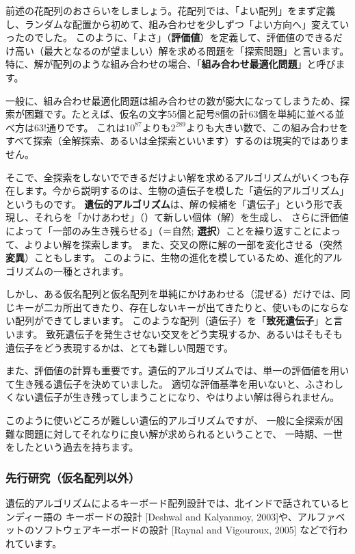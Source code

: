 前述の花配列のおさらいをしましょう。花配列では、「よい配列」をまず定義し、ランダムな配置から初めて、組み合わせを少しずつ「よい方向へ」変えていったのでした。
このように、「よさ」（{\bf 評価値}）を定義して、評価値のできるだけ高い（最大となるのが望ましい）解を求める問題を「探索問題」と言います。
特に、解が配列のような組み合わせの場合、「{\bf 組み合わせ最適化問題}」と呼びます。

一般に、組み合わせ最適化問題は組み合わせの数が膨大になってしまうため、探索が困難です。たとえば、仮名の文字55個と記号8個の計63個を単純に並べる並べ方は$63!$通りです。
これは$10^{87}$よりも$2^{289}$よりも大きい数で、この組み合わせをすべて探索（全解探索、あるいは全探索といいます）するのは現実的ではありません。

そこで、全探索をしないでできるだけよい解を求めるアルゴリズムがいくつも存在します。今から説明するのは、生物の遺伝子を模した「遺伝的アルゴリズム」というものです。
{\bf 遺伝的アルゴリズム}は、解の候補を「遺伝子」という形で表現し、それらを「かけあわせ」（）て新しい個体（解）を生成し、
さらに評価値によって「一部のみ生き残らせる」（＝自然; {\bf 選択}）ことを繰り返すことによって、よりよい解を探索します。
また、交叉の際に解の一部を変化させる（突然{\bf 変異}）こともします。
このように、生物の進化を模しているため、進化的アルゴリズムの一種とされます。

しかし、ある仮名配列と仮名配列を単純にかけあわせる（混ぜる）だけでは、同じキーが二カ所出てきたり、存在しないキーが出てきたりと、使いものにならない配列ができてしまいます。
このような配列（遺伝子）を「{\bf 致死遺伝子}」と言います。
致死遺伝子を発生させない交叉をどう実現するか、あるいはそもそも遺伝子をどう表現するかは、とても難しい問題です。

また、評価値の計算も重要です。遺伝的アルゴリズムでは、単一の評価値を用いて生き残る遺伝子を決めていました。
適切な評価基準を用いないと、ふさわしくない遺伝子が生き残ってしまうことになり、やはりよい解は得られません。

このように使いどころが難しい遺伝的アルゴリズムですが、
一般に全探索が困難な問題に対してそれなりに良い解が求められるということで、
一時期、一世をしたという過去を持ちます。

\subsubsection*{先行研究（仮名配列以外）}

遺伝的アルゴリズムによるキーボード配列設計では、北インドで話されているヒンディー語の
キーボードの設計 [Deshwal and Kalyanmoy, 2003]や、アルファベットのソフトウェアキーボードの設計 [Raynal and Vigouroux, 2005] などで行われています。

